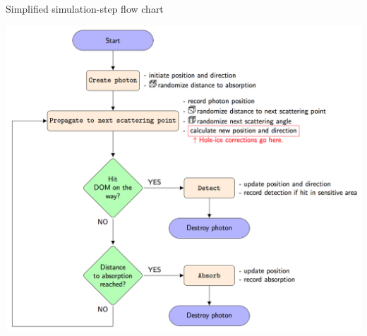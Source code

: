 
\begin{frame}{Simplified simulation-step flow chart}
  \begin{center}
    \includegraphics[height=0.8\textheight]{img/simulation-step-flow-chart}
  \end{center}

\end{frame}